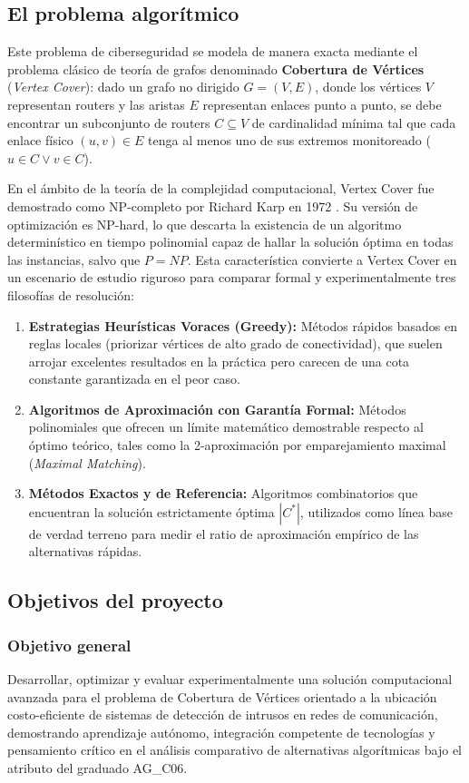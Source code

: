 \documentclass[11pt,a4paper]{article}
\begin{document}
\subsection{El problema algorítmico}
Este problema de ciberseguridad se modela de manera exacta mediante el problema clásico de teoría de grafos denominado \textbf{Cobertura de Vértices} (\textit{Vertex Cover}): dado un grafo no dirigido $G = (V, E)$, donde los vértices $V$ representan routers y las aristas $E$ representan enlaces punto a punto, se debe encontrar un subconjunto de routers $C \subseteq V$ de cardinalidad mínima tal que cada enlace físico $(u, v) \in E$ tenga al menos uno de sus extremos monitoreado ($u \in C \lor v \in C$).

En el ámbito de la teoría de la complejidad computacional, Vertex Cover fue demostrado como NP-completo por Richard Karp en 1972 \cite{karp1972}. Su versión de optimización es NP-hard, lo que descarta la existencia de un algoritmo determinístico en tiempo polinomial capaz de hallar la solución óptima en todas las instancias, salvo que $P = NP$. Esta característica convierte a Vertex Cover en un escenario de estudio riguroso para comparar formal y experimentalmente tres filosofías de resolución:
\begin{enumerate}[itemsep=1pt]
	\item \textbf{Estrategias Heurísticas Voraces (Greedy):} Métodos rápidos basados en reglas locales (priorizar vértices de alto grado de conectividad), que suelen arrojar excelentes resultados en la práctica pero carecen de una cota constante garantizada en el peor caso.
	\item \textbf{Algoritmos de Aproximación con Garantía Formal:} Métodos polinomiales que ofrecen un límite matemático demostrable respecto al óptimo teórico, tales como la 2-aproximación por emparejamiento maximal (\textit{Maximal Matching}).
	\item \textbf{Métodos Exactos y de Referencia:} Algoritmos combinatorios que encuentran la solución estrictamente óptima $|C^*|$, utilizados como línea base de verdad terreno para medir el ratio de aproximación empírico de las alternativas rápidas.
\end{enumerate}

\subsection{Objetivos del proyecto}

\subsubsection*{Objetivo general}
Desarrollar, optimizar y evaluar experimentalmente una solución computacional avanzada para el problema de Cobertura de Vértices orientado a la ubicación costo-eficiente de sistemas de detección de intrusos en redes de comunicación, demostrando aprendizaje autónomo, integración competente de tecnologías y pensamiento crítico en el análisis comparativo de alternativas algorítmicas bajo el atributo del graduado AG\_C06.
\end{document}

